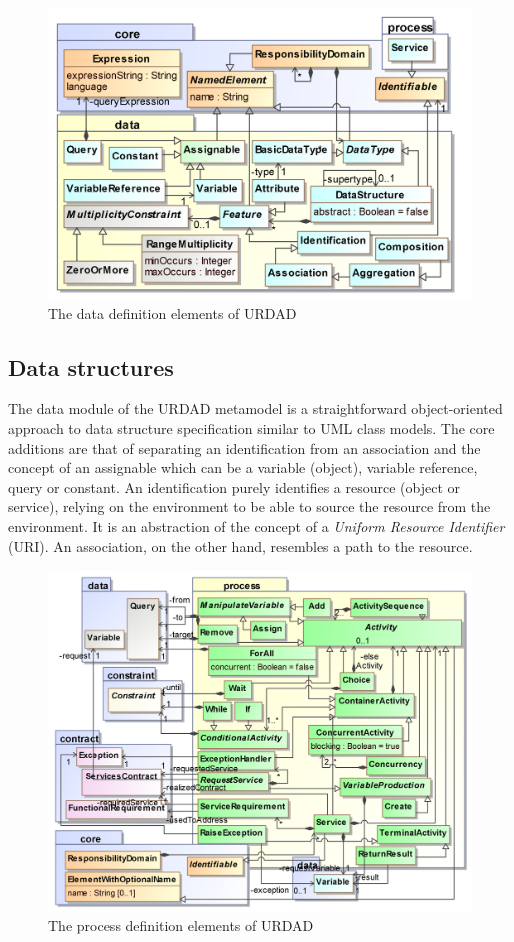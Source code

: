 \begin{figure}[Htbp]
  \centering
  \includegraphics{data}
  \caption{The data definition elements of URDAD}
  \label{fig:metamodel}
\end{figure}

\subsection{Data structures}

The data module of the URDAD metamodel is a straightforward object-oriented approach to data structure specification similar to UML class models. The core additions are that of separating an identification from an association and the concept of an assignable which can be a variable (object), variable reference, query or constant. An identification purely identifies a resource (object or service), relying on the environment to be able to source the resource from the environment. It is an abstraction of the concept of a \emph{Uniform Resource Identifier} (URI). An association, on the other hand, resembles a path to the resource.

\begin{figure}[Htbp]
  \centering
  \includegraphics{process}
  \caption{The process definition elements of URDAD}
  \label{fig:metamodel}
\end{figure}

